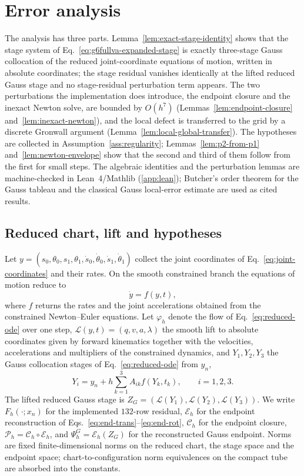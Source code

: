 \section{Error analysis}
\label{sec:order}

The analysis has three parts. Lemma~\ref{lem:exact-stage-identity} shows that the stage system of
Eq.~\eqref{eq:g6fullva-expanded-stage} is exactly three-stage Gauss collocation of the reduced
joint-coordinate equations of motion, written in absolute coordinates; the stage residual vanishes
identically at the lifted reduced Gauss stage and no stage-residual perturbation term appears.
The two perturbations the implementation does introduce, the endpoint closure and the inexact
Newton solve, are bounded by $O(h^7)$ (Lemmas~\ref{lem:endpoint-closure}
and~\ref{lem:inexact-newton}), and the local defect is transferred to the grid by a discrete
Gronwall argument (Lemma~\ref{lem:local-global-transfer}). The hypotheses are collected in
Assumption~\ref{ass:regularity}; Lemmas~\ref{lem:p2-from-p1} and~\ref{lem:newton-envelope} show that
the second and third of them follow from the first for small steps. The algebraic identities and the
perturbation lemmas are machine-checked in Lean~4/Mathlib (\ref{app:lean}); Butcher's
order theorem for the Gauss tableau and the classical Gauss local-error estimate
\cite{hairer1993solving} are used as cited results.

\subsection{Reduced chart, lift and hypotheses}

Let $y=(s_0,\theta_0,s_1,\theta_1,\dot s_0,\dot\theta_0,\dot s_1,\dot\theta_1)$ collect the joint
coordinates of Eq.~\eqref{eq:joint-coordinates} and their rates. On the smooth constrained branch
the equations of motion reduce to
\begin{equation}
  \dot y=f(y,t),
  \label{eq:reduced-ode}
\end{equation}
where $f$ returns the rates and the joint accelerations obtained from the constrained Newton--Euler
equations. Let $\varphi_h$ denote the flow of Eq.~\eqref{eq:reduced-ode} over one step,
$\mathcal L(y,t)=(q,v,a,\lambda)$ the smooth lift to absolute coordinates given by forward
kinematics together with the velocities, accelerations and multipliers of the constrained dynamics,
and $Y_1,Y_2,Y_3$ the Gauss collocation stages of Eq.~\eqref{eq:reduced-ode} from $y_n$,
\begin{equation}
  Y_i=y_n+h\sum_{k=1}^3A_{ik}f(Y_k,t_k),\qquad i=1,2,3 .
  \label{eq:reduced-gauss-stages}
\end{equation}
The lifted reduced Gauss stage is $Z_G=(\mathcal L(Y_1),\mathcal L(Y_2),\mathcal L(Y_3))$. We write
$F_h(\cdot;x_n)$ for the implemented $132$-row residual, $\mathcal E_h$ for the endpoint
reconstruction of Eqs.~\eqref{eq:end-trans}--\eqref{eq:end-rot}, $\mathcal C_h$ for the endpoint
closure, $\mathcal P_h=\mathcal C_h\circ\mathcal E_h$, and $\Psi_h^G=\mathcal E_h(Z_G)$ for the
reconstructed Gauss endpoint. Norms are fixed finite-dimensional norms on the reduced chart, the
stage space and the endpoint space; chart-to-configuration norm equivalences on the compact tube are
absorbed into the constants.

